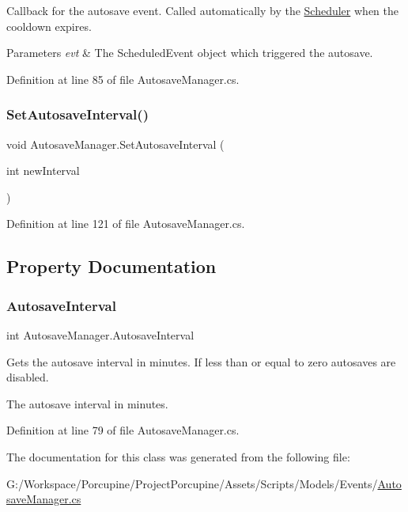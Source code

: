 Callback for the autosave event. Called automatically by the \hyperlink{namespace_scheduler}{Scheduler} when the cooldown expires. 


\begin{DoxyParams}{Parameters}
{\em evt} & The Scheduled\+Event object which triggered the autosave.\\
\hline
\end{DoxyParams}


Definition at line 85 of file Autosave\+Manager.\+cs.

\mbox{\label{class_autosave_manager_a66567b6e5e1ec3a234656bb24b82dcca}} 
\subsubsection{\texorpdfstring{Set\+Autosave\+Interval()}{SetAutosaveInterval()}}
{\footnotesize\ttfamily void Autosave\+Manager.\+Set\+Autosave\+Interval (\begin{DoxyParamCaption}\item[{int}]{new\+Interval }\end{DoxyParamCaption})}



Definition at line 121 of file Autosave\+Manager.\+cs.



\subsection{Property Documentation}
\mbox{\label{class_autosave_manager_aa499ab2fe041ef5134db38b40404329f}} 
\subsubsection{\texorpdfstring{Autosave\+Interval}{AutosaveInterval}}
{\footnotesize\ttfamily int Autosave\+Manager.\+Autosave\+Interval\hspace{0.3cm}{\ttfamily [get]}}



Gets the autosave interval in minutes. If less than or equal to zero autosaves are disabled. 

The autosave interval in minutes.

Definition at line 79 of file Autosave\+Manager.\+cs.



The documentation for this class was generated from the following file\+:\begin{DoxyCompactItemize}
\item 
G\+:/\+Workspace/\+Porcupine/\+Project\+Porcupine/\+Assets/\+Scripts/\+Models/\+Events/\hyperlink{_autosave_manager_8cs}{Autosave\+Manager.\+cs}\end{DoxyCompactItemize}
